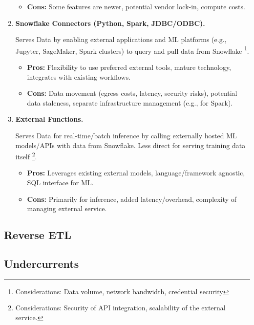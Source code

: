 \begin{enumerate}
\begin{itemize}
        \item \textbf{Cons:} Some features are newer,
        potential vendor lock-in, compute costs.
    \end{itemize}


    \item \textbf{Snowflake Connectors (Python, Spark, JDBC/ODBC).}
    
    \noindent
    Serves Data by enabling external applications and ML platforms
    (e.g., Jupyter, SageMaker, Spark clusters)
    to query and pull data from Snowflake
    \footnote{
        Considerations: Data volume, network bandwidth,
        credential security
    }.
    \begin{itemize}
        \item \textbf{Pros:}
        Flexibility to use preferred external tools, mature technology,
        integrates with existing workflows.
        
        \item \textbf{Cons:} Data movement
        (egress costs, latency, security risks),
        potential data staleness,
        separate infrastructure management (e.g., for Spark).
    \end{itemize}
    

    \item \textbf{External Functions.}
    
    \noindent
    Serves Data for real-time/batch inference by
    calling externally hosted ML models/APIs with
    data from Snowflake. Less direct for serving
    training data itself
    \footnote{
        Considerations: Security of API integration,
        scalability of the external service.
    }.
    \begin{itemize}
        \item \textbf{Pros:}
        Leverages existing external models, language/framework agnostic,
        SQL interface for ML.
        
        \item \textbf{Cons:} Primarily for inference,
        added latency/overhead, complexity of managing external service.
    \end{itemize}

\end{enumerate}



\subsection{Reverse ETL}






\subsection{Undercurrents}



